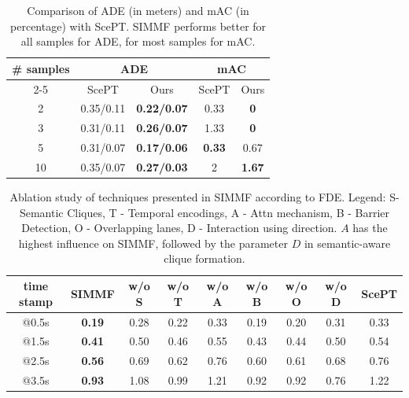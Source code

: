 \documentclass[letterpaper, 10 pt, conference]{ieeeconf}  %
\begin{document}
\begin{table}[h]
\begin{center}
    \begin{tabular}{ccccc}
   
\toprule
\multirow{ 2}{*}{\# samples}  &
\multicolumn{2}{c}{ADE} & \multicolumn{2}{c}{mAC}\\
\cmidrule{2-5}
 & ScePT  & Ours & ScePT  & Ours\\
\midrule

 2 &
0.35/0.11 & \textbf{0.22/0.07} & 0.33  & \textbf{0} \\



 3 &
0.31/0.11 & \textbf{0.26/0.07} & 1.33  & \textbf{0} 


\\
 5 & 0.31/0.07 & \textbf{0.17/0.06} &
\textbf{0.33}  & 0.67
\\ 10 & 0.35/0.07 & \textbf{0.27/0.03}
& 2 &\textbf{ 1.67}
\\

\bottomrule
\end{tabular}

\end{center}
\vspace{-0.1in}
\caption{Comparison of ADE (in meters) and mAC (in percentage) with ScePT. SIMMF performs better for all samples for ADE, for most samples for mAC.}\label{ade}\vspace{-0.1in}
\end{table}
\begin{table}[h]
\centering
  \begin{tabular}{ccccccccc}
   
\toprule
time stamp  &SIMMF & w/o S & w/o T &  w/o A & w/o B & w/o O & w/o D & ScePT\\
\midrule
@0.5s & \textbf{0.19} & 0.28 & 0.22 & 0.33 & 0.19 & 0.20 & 0.31 & 0.33 \\
 @1.5s  &\textbf{ 0.41} & 0.50 & 0.46 & 0.55 & 0.43 & 0.44 & 0.50 & 0.54 \\

  @2.5s&\textbf{0.56}& 0.69&0.62& 0.76 & 0.60 & 0.61 & 0.68 & 0.76\\
@3.5s & \textbf{0.93} & 1.08 & 0.99 & 1.21 & 0.92 & 0.92 & 0.76 & 1.22\\
\bottomrule
\end{tabular}
\vspace{0.1in}
\caption{Ablation study of techniques presented in SIMMF according to FDE. Legend: S- Semantic Cliques, T - Temporal encodings, A - Attn mechanism, B - Barrier Detection, O - Overlapping lanes, D - Interaction using direction. $A$ has the highest influence on SIMMF, followed by the parameter $D$ in semantic-aware clique formation.}
\label{table:ablation}
\vspace{-0.1in}\end{table}
\end{document}
